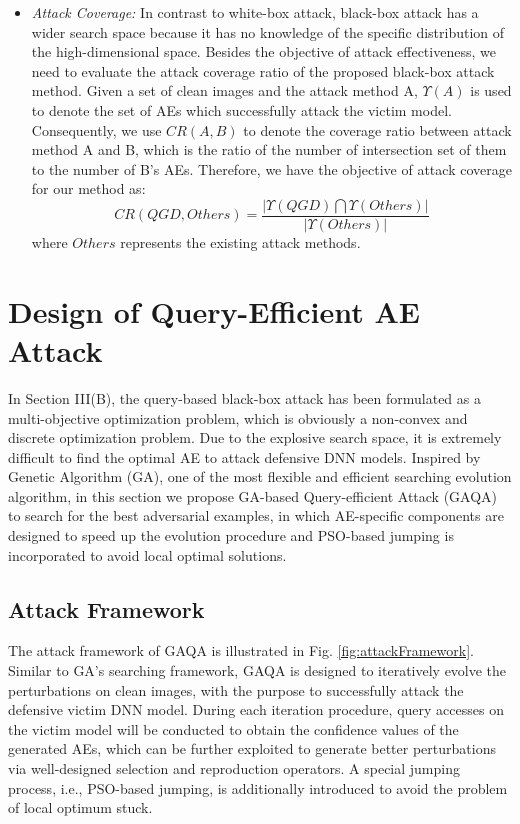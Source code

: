 \documentclass[lettersize,journal]{IEEEtran}
\begin{document}
\begin{itemize}
		
		\item \textit{Attack Coverage:} In contrast to white-box attack, black-box attack has a wider search space because it has no knowledge of the specific distribution of the high-dimensional space. Besides the objective of attack effectiveness, we need to evaluate the attack coverage ratio of the proposed black-box attack method. Given a set of clean  images and the attack method A, $\Upsilon(A)$ is used to denote the set of AEs which successfully attack the victim model. Consequently, we use $CR(A, B)$ to denote the coverage ratio between attack method A and B, which is the ratio of the number of intersection set of them to the number of B's AEs. Therefore, we have the objective of attack coverage for our method as:
		\begin{equation}
			\label{eq:coverage}
			CR(QGD, Others) = \frac{|\Upsilon(QGD)\bigcap \Upsilon(Others)|}{|\Upsilon(Others)|}
		\end{equation}
		where $Others$ represents the existing attack methods.
		
		
	\end{itemize}
	
	\section{Design of Query-Efficient AE Attack}
	In Section III(B), the query-based black-box attack has been formulated as a multi-objective optimization problem, which is obviously a non-convex and discrete optimization problem. Due to the explosive search space, it is extremely difficult to find the optimal AE to attack defensive DNN models. Inspired by Genetic Algorithm (GA), one of the most flexible and efficient searching evolution algorithm, in this section we propose GA-based Query-efficient Attack (GAQA) to search for the best adversarial examples, in which AE-specific components are designed to speed up the evolution procedure and PSO-based jumping is incorporated to avoid local optimal solutions.
	
	
	\subsection{Attack Framework}
	The attack framework of GAQA is illustrated in Fig. \ref{fig:attackFramework}. Similar to GA's searching framework, GAQA is designed to iteratively evolve the perturbations on clean images, with the purpose to successfully attack the defensive victim DNN model. During each iteration procedure, query accesses on the victim model will be conducted to obtain the confidence values of the generated AEs, which can be further exploited to generate better perturbations via well-designed selection and reproduction operators. A special jumping process, i.e., PSO-based jumping, is additionally introduced to avoid the problem of local optimum stuck.
	
\end{document}
